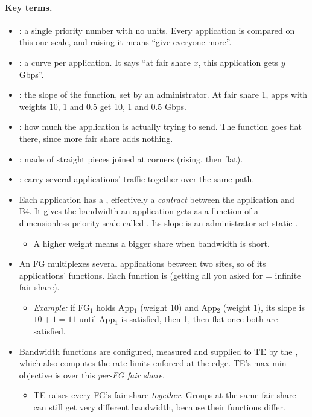 \paragraph{Key terms.}
\begin{itemize}
\item {}: a single priority number with no units. Every application is compared on this one scale, and raising it means ``give everyone more''.
\item {}: a curve per application. It says ``at fair share $x$, this application gets $y$ Gbps''.
\item {}: the slope of the function, set by an administrator. At fair share 1, apps with weights 10, 1 and 0.5 get 10, 1 and 0.5 Gbps.
\item {}: how much the application is actually trying to send. The function goes flat there, since more fair share adds nothing.
\item {}: made of straight pieces joined at corners (rising, then flat).
\item {}: carry several applications' traffic together over the same path.
\end{itemize}

\begin{itemize}
\item Each application has a , effectively a \emph{contract} between the application and B4. It gives the bandwidth an application gets as a function of a dimensionless priority scale called . Its slope is an administrator-set static .
  \begin{itemize}
  \item A higher weight means a bigger share when bandwidth is short.
  \end{itemize}
\item An FG multiplexes several applications between two sites, so  of its applications' functions. Each function is  (getting all you asked for = infinite fair share).
  \begin{itemize}
  \item \emph{Example:} if FG$_1$ holds App$_1$ (weight 10) and App$_2$ (weight 1), its slope is $10+1=11$ until App$_1$ is satisfied, then 1, then flat once both are satisfied.
  \end{itemize}
\item Bandwidth functions are configured, measured and supplied to TE by the , which also computes the rate limits enforced at the edge. TE's max-min objective is over this \emph{per-FG fair share}.
  \begin{itemize}
  \item TE raises every FG's fair share \emph{together}. Groups at the same fair share can still get very different bandwidth, because their functions differ.
  \end{itemize}
\end{itemize}

